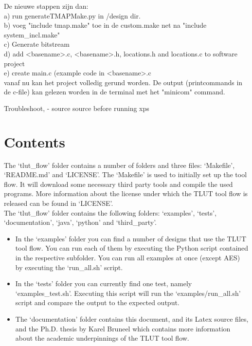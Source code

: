\documentclass[a4paper,oneside]{memoir}
\begin{document}
De nieuwe stappen zijn dan:\\
a) run generateTMAPMake.py in /design dir.\\
b) voeg "include tmap.make" toe in de custom.make net na "include system\_incl.make"\\
c) Generate bitstream\\
d) add <basename>.c, <basename>.h, locations.h and locations.c to  software project\\
e) create main.c (example code in <basename>.c\\
vanaf nu kan het project volledig gerund worden. De output (printcommands in de c-file) kan gelezen worden in de terminal met het "minicom" command.


Troubleshoot, - source source before running xps




\clearpage
\chapter{Contents}\label{sec:contents}
The `tlut\_flow' folder contains a number of folders and three files: `Makefile', `README.md' and `LICENSE'. 
The `Makefile' is used to initially set up the tool flow. It will download  some necessary third party tools and compile the used programs.
More information about the license under which the TLUT tool flow is released can be found in `LICENSE'.\\

The `tlut\_flow' folder contains the following folders:  `examples', `tests', `documentation',  `java', `python' and `third\_party'.

\begin{itemize}
\item In the `examples' folder you can find a number of designs that use the TLUT tool flow. You can run each of them by executing the Python script contained in the respective subfolder. You can run all examples at once (except AES) by executing the `run\_all.sh' script.
\item In the `tests' folder you can currently find one test, namely `examples\_test.sh'. Executing this script will run the `examples/run\_all.sh' script and compare the output to the expected output.
\item The `documentation' folder contains this document, and its Latex source files, and the Ph.D. thesis by Karel Bruneel which contains more information about the academic underpinnings of the TLUT tool flow.
\end{itemize}
\end{document}
